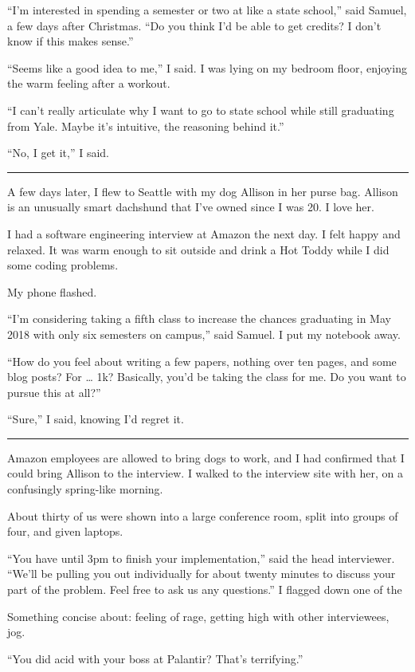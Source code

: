 
``I'm interested in spending a semester or two at like a state school,'' said
Samuel, a few days after Christmas.  ``Do you think I'd be able to get credits?
I don't know if this makes sense.''

``Seems like a good idea to me,'' I said.  I was lying on my bedroom floor,
enjoying the warm feeling after a workout.

``I can't really articulate why I want to go to state school while still
graduating from Yale.   Maybe it's intuitive, the reasoning behind it.'' 

``No, I get it,'' I said.

\fancybreak{* * *}

A few days later, I flew to Seattle with my dog Allison in her purse bag.
Allison is an unusually smart dachshund that I've owned since I was 20.  I love
her.  

I had a software engineering interview at Amazon the next day.  I felt happy and
relaxed.  It was warm enough to sit outside and drink a Hot Toddy while I did
some coding problems. 

My phone flashed.

``I'm considering taking a fifth class to increase the chances graduating in May
2018 with only six semesters on campus,'' said Samuel.  I put my notebook away.

``How do you feel about writing a few papers, nothing over ten pages,
and some blog posts?  For … 1k?  Basically, you'd be taking the class for me.
Do you want to pursue this at all?'' 

``Sure,'' I said, knowing I'd regret it.

\fancybreak{* * *}

Amazon employees are allowed to bring dogs to work, and I had confirmed that I
could bring Allison to the interview.  I walked to the interview site with
her, on a confusingly spring-like morning. 

About thirty of us were shown into a large conference room, split into groups of
four, and given laptops.  

``You have until 3pm to finish your implementation,'' said the head interviewer.
``We'll be pulling you out individually for about twenty minutes to discuss your
part of the problem.  Feel free to ask us any questions.'' I flagged down one of
the 

Something concise about: feeling of rage, getting high with other interviewees, jog.

``You did acid with your boss at Palantir?  That's terrifying.''

